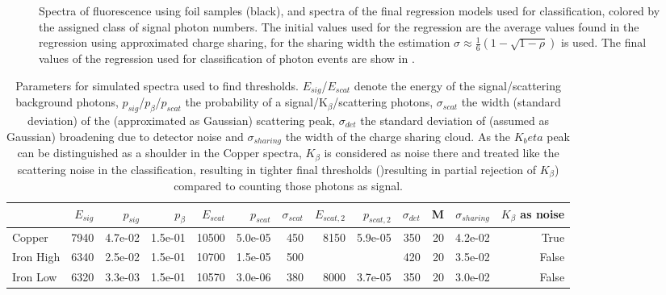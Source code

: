 \begin{figure}[h!]
\begin{subfigure}[b]{0.32\textwidth}
	\end{subfigure}
	\caption[Spectra of fluorescence using foil samples with photon number classes]{Spectra of fluorescence using foil samples (black), and spectra of the final regression models used for classification, colored by the assigned class of signal photon numbers. The initial values used for the regression are the average values found in the regression using approximated charge sharing, for the sharing width the estimation $\sigma\approx\frac{1}{6} \left(1-\sqrt{1-\rho }\right)$ is used.  The final values of the regression used for classification of photon events are show in .}
	\label{fig:thresholdsfoil}
\end{figure}


\FloatBarrier
\begin{table}[h!]
	\centering
	\caption[Parameters for simulated spectra used to find thresholds]{Parameters for simulated spectra used to find thresholds. $E_{sig}$/$E_{scat}$ denote the energy of the signal/scattering background photons, $p_{sig}$/$p_{\beta}$/$p_{scat}$ the probability of a signal/K$_{\beta}$/scattering photons, $\sigma_{scat}$ the width (standard deviation) of the (approximated as Gaussian) scattering peak, $\sigma_{det}$ the standard deviation of (assumed as Gaussian) broadening due to detector noise and $\sigma_{sharing}$ the width of the charge sharing cloud.  As the $K_beta$ peak can be distinguished as a shoulder in the Copper spectra, $K_{\beta}$ is considered as noise there and treated like the scattering noise in the classification, resulting in tighter final thresholds ()resulting in partial rejection of  $K_{\beta}$) compared to counting those photons as signal.}
	\label{tab:fitvalues}
	\scriptsize
	\begin{adjustwidth}{-1em}{-1em}	
		\begin{tabular}{lrrrrrrrrrrrr}
			
			\toprule
			{} &  $E_{sig}$ &  $p_{sig}$ &  $p_{\beta}$ &  $E_{scat}$ &  $p_{scat}$ &  $\sigma_{scat}$ & $E_{scat,2}$ & $p_{scat,2}$ &  $\sigma_{det}$ &   M &  $\sigma_{sharing}$ &  $K_{\beta}$ as noise \\	\midrule
			Copper &          7940 &       4.7e-02 &     1.5e-01 &          10500 &        5.0e-05 &                 450 &           8150 &        5.9e-05 &             350 &  20 &             4.2e-02 &                  True \\
			Iron High         &          6340 &       2.5e-02 &     1.5e-01 &          10700 &        1.5e-05 &                 500 &                &                &             420 &  20 &             3.5e-02 &                 False \\
			Iron Low          &          6320 &       3.3e-03 &     1.5e-01 &          10570 &        3.0e-06 &                 380 &           8000 &        3.7e-05 &             350 &  20 &             3.0e-02 &                 False \\
			\bottomrule
		\end{tabular}
	\end{adjustwidth}
\end{table}


